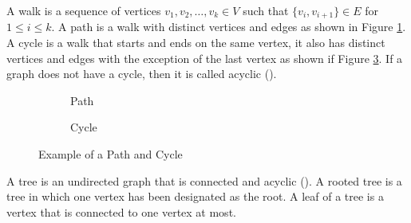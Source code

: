 A walk is a sequence of vertices $v_1, v_2, \ldots, v_k \in V$ such that $\{v_i, v_{i+1}\} \in E$ for $1 \le i \le k$. A path is a walk with distinct vertices and edges as shown in Figure \ref{fig:path}. A cycle is a walk that starts and ends on the same vertex, it also has distinct vertices and edges with the exception of the last vertex as shown if Figure \ref{fig:cycle}. If a graph does not have a cycle, then it is called acyclic (\cite{diestel2024graph}).

\begin{figure}[htb]
    \centering
    \begin{subfigure}{0.4\textwidth}
        \centering
        \caption{Path}
        \label{fig:path}
    \end{subfigure}
    \qquad
    \begin{subfigure}{0.4\textwidth}
        \centering
        \caption{Cycle}
        \label{fig:cycle}
    \end{subfigure}
    \caption{Example of a Path and Cycle}
\end{figure}

A tree is an undirected graph that is connected and acyclic (\cite{diestel2024graph}). A rooted tree is a tree in which one vertex has been designated as the root. A leaf of a tree is a vertex that is connected to one vertex at most.

